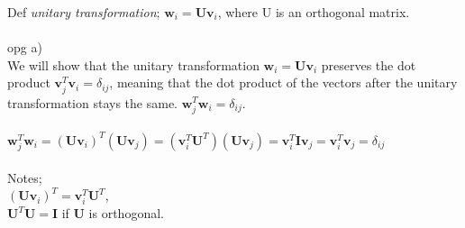 \documentclass[12pt,a4paper]{article}
\begin{document}
Def \textit{unitary transformation}; $\textbf{w}_i = \textbf{U}\textbf{v}_i$, where U is an orthogonal matrix.\\
\\
opg a)\\
We will show that the unitary transformation $\textbf{w}_i = \textbf{U}\textbf{v}_i$ preserves the dot product $\textbf{v}_j^T\textbf{v}_i = \delta_{ij}$, meaning that the dot product of the vectors after the unitary transformation stays the same. $\textbf{w}_j^T\textbf{w}_i = \delta_{ij}$.\\
\\
$\textbf{w}_j^T\textbf{w}_i = (\textbf{U}\textbf{v}_i)^T(\textbf{U}\textbf{v}_j) = (\textbf{v}_i^T\textbf{U}^T)(\textbf{U}\textbf{v}_j) = \textbf{v}_i^T\textbf{I}\textbf{v}_j = \textbf{v}_i^T\textbf{v}_j = \delta_{ij}$\\
\\
Notes;\\
$(\textbf{U}\textbf{v}_i)^T = \textbf{v}_i^T\textbf{U}^T$,\\
$\textbf{U}^T\textbf{U} = \textbf{I}$ if $\textbf{U}$ is orthogonal.
\end{document}
